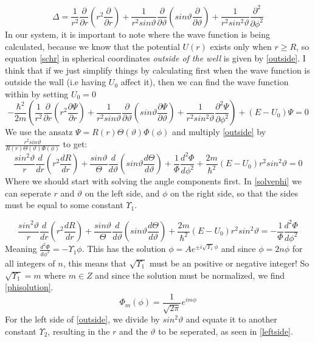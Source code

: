 \documentclass{article}
\begin{document}
\begin{equation}
\Delta = \frac{1}{r^2} \frac{\partial}{\partial r}(r^2 \frac{\partial}{\partial r}) + \frac{1}{r^2 sin\vartheta}\frac{\partial}{\partial \vartheta} (sin\vartheta \frac{\partial}{\partial \vartheta}) + \frac{1}{r^2 sin^2\vartheta}\frac{\partial^2}{\partial \phi^2}
\label{lsphere}
\end{equation}
In our system, it is important to note where the wave function is being calculated, because we know that the potential $U(r)$ exists only when $r \ge R$, so equation \ref{schr} in spherical coordinates \textit{outside of the well} is given by \ref{outside}. I think that if we just simplify things by calculating first when the wave function is outside the wall (i.e having $U_0$ affect it), then we can find the wave function within by setting $U_0 = 0$
\begin{equation}
-\frac{\hbar^2}{2m} \left( \frac{1}{r^2} \frac{\partial }{\partial r}(r^2 \frac{\partial \Psi}{\partial r}) + \frac{1}{r^2 sin\vartheta}\frac{\partial}{\partial \vartheta} (sin\vartheta \frac{\partial \Psi}{\partial \vartheta}) + \frac{1}{r^2 sin^2\vartheta}\frac{\partial^2 \Psi}{\partial \phi^2} \right) + (E - U_0)\Psi = 0
\label{outside}
\end{equation}
We use the ansatz $\Psi = R(r)\Theta (\vartheta) \Phi ( \phi)$ and multiply \ref{outside} by $\frac{r^2 sin\vartheta}{R(r) \Theta(\vartheta) \Phi (\phi)}$ to get:
$$ \frac{sin^2 \vartheta}{r} \frac{d}{dr} \left(r^2\frac{dR}{dr} \right) + \frac{sin\vartheta}{\Theta} \frac{d}{d\vartheta} \left( sin\vartheta \frac{d\Theta}{d\vartheta} \right) +\frac{1}{\Phi}\frac{d^2 \Phi}{d \phi^2} + \frac{2m}{\hbar^2} (E - U_0) r^2 sin^2\vartheta =  0$$
Where we should start with solving the angle components first. In \ref{solvephi} we can seperate $r$ and $\vartheta$ on the left side, and $\phi$ on the right side, so that the sides must be equal to some constant $\Upsilon _1$.

\begin{equation}
\frac{sin^2 \vartheta}{r} \frac{d}{dr} \left(r^2\frac{dR}{dr} \right) + \frac{sin\vartheta}{\Theta} \frac{d}{d\vartheta} \left( sin\vartheta \frac{d\Theta}{d\vartheta} \right) + \frac{2m}{\hbar^2} (E - U_0) r^2 sin^2\vartheta = -  \frac{1}{\Phi}\frac{d^2 \Phi}{d \phi^2}
\label{solvephi}
\end{equation}
Meaning $\frac{d^2 \Phi}{d\phi^2} = -\Upsilon _1 \phi$. This  has the solution $\phi = A e^{\pm i\sqrt{\Upsilon _1} \phi}$ and since $\phi = 2n\phi$ for all integers of $n$, this means that $\sqrt{\Upsilon _1}$ must be an positive or negative integer! So   $\sqrt{\Upsilon _1} = m$ where $m \in Z$ and since the solution must be normalized, we find \ref{phisolution}.
\begin{equation}
\Phi_m (\phi) = \frac{1}{\sqrt{2\pi}}e^{im\phi}
\label{phisolution}
\end{equation}
For the left side of \ref{outside}, we divide by $sin^2\vartheta$ and equate it to another constant $\Upsilon_2$, resulting in the $r$ and the $\vartheta$ to be seperated, as seen in \ref{leftside}.
\end{document}

